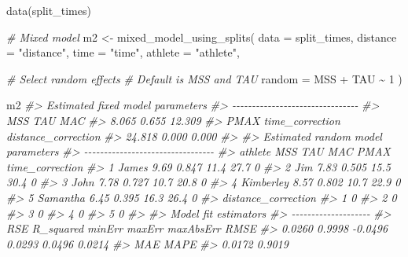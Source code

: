 \documentclass[fleqn,10pt]{wlpeerj} %
\newenvironment{Shaded}{\begin{snugshade}}{\end{snugshade}}
\newcommand{\AttributeTok}[1]{\textcolor[rgb]{0.77,0.63,0.00}{#1}}
\newcommand{\CommentTok}[1]{\textcolor[rgb]{0.56,0.35,0.01}{\textit{#1}}}
\newcommand{\DecValTok}[1]{\textcolor[rgb]{0.00,0.00,0.81}{#1}}
\newcommand{\FunctionTok}[1]{\textcolor[rgb]{0.00,0.00,0.00}{#1}}
\newcommand{\NormalTok}[1]{#1}
\newcommand{\OtherTok}[1]{\textcolor[rgb]{0.56,0.35,0.01}{#1}}
\newcommand{\SpecialCharTok}[1]{\textcolor[rgb]{0.00,0.00,0.00}{#1}}
\newcommand{\StringTok}[1]{\textcolor[rgb]{0.31,0.60,0.02}{#1}}
\begin{document}
\begin{Shaded}
\begin{Highlighting}[]
\FunctionTok{data}\NormalTok{(split\_times)}

\CommentTok{\# Mixed model}
\NormalTok{m2 }\OtherTok{\textless{}{-}} \FunctionTok{mixed\_model\_using\_splits}\NormalTok{(}
  \AttributeTok{data =}\NormalTok{ split\_times,}
  \AttributeTok{distance =} \StringTok{"distance"}\NormalTok{,}
  \AttributeTok{time =} \StringTok{"time"}\NormalTok{,}
  \AttributeTok{athlete =} \StringTok{"athlete"}\NormalTok{,}

  \CommentTok{\# Select random effects}
  \CommentTok{\# Default is MSS and TAU}
  \AttributeTok{random =}\NormalTok{ MSS }\SpecialCharTok{+}\NormalTok{ TAU }\SpecialCharTok{\textasciitilde{}} \DecValTok{1}
\NormalTok{)}

\NormalTok{m2}
\CommentTok{\#\textgreater{} Estimated fixed model parameters}
\CommentTok{\#\textgreater{} {-}{-}{-}{-}{-}{-}{-}{-}{-}{-}{-}{-}{-}{-}{-}{-}{-}{-}{-}{-}{-}{-}{-}{-}{-}{-}{-}{-}{-}{-}{-}{-}}
\CommentTok{\#\textgreater{}                 MSS                 TAU                 MAC }
\CommentTok{\#\textgreater{}               8.065               0.655              12.309 }
\CommentTok{\#\textgreater{}                PMAX     time\_correction distance\_correction }
\CommentTok{\#\textgreater{}              24.818               0.000               0.000 }
\CommentTok{\#\textgreater{} }
\CommentTok{\#\textgreater{} Estimated random model parameters}
\CommentTok{\#\textgreater{} {-}{-}{-}{-}{-}{-}{-}{-}{-}{-}{-}{-}{-}{-}{-}{-}{-}{-}{-}{-}{-}{-}{-}{-}{-}{-}{-}{-}{-}{-}{-}{-}{-}}
\CommentTok{\#\textgreater{}     athlete  MSS   TAU  MAC PMAX time\_correction}
\CommentTok{\#\textgreater{} 1     James 9.69 0.847 11.4 27.7               0}
\CommentTok{\#\textgreater{} 2       Jim 7.83 0.505 15.5 30.4               0}
\CommentTok{\#\textgreater{} 3      John 7.78 0.727 10.7 20.8               0}
\CommentTok{\#\textgreater{} 4 Kimberley 8.57 0.802 10.7 22.9               0}
\CommentTok{\#\textgreater{} 5  Samantha 6.45 0.395 16.3 26.4               0}
\CommentTok{\#\textgreater{}   distance\_correction}
\CommentTok{\#\textgreater{} 1                   0}
\CommentTok{\#\textgreater{} 2                   0}
\CommentTok{\#\textgreater{} 3                   0}
\CommentTok{\#\textgreater{} 4                   0}
\CommentTok{\#\textgreater{} 5                   0}
\CommentTok{\#\textgreater{} }
\CommentTok{\#\textgreater{} Model fit estimators}
\CommentTok{\#\textgreater{} {-}{-}{-}{-}{-}{-}{-}{-}{-}{-}{-}{-}{-}{-}{-}{-}{-}{-}{-}{-}}
\CommentTok{\#\textgreater{}       RSE R\_squared    minErr    maxErr maxAbsErr      RMSE }
\CommentTok{\#\textgreater{}    0.0260    0.9998   {-}0.0496    0.0293    0.0496    0.0214 }
\CommentTok{\#\textgreater{}       MAE      MAPE }
\CommentTok{\#\textgreater{}    0.0172    0.9019}
\end{Highlighting}
\end{Shaded}
\end{document}
